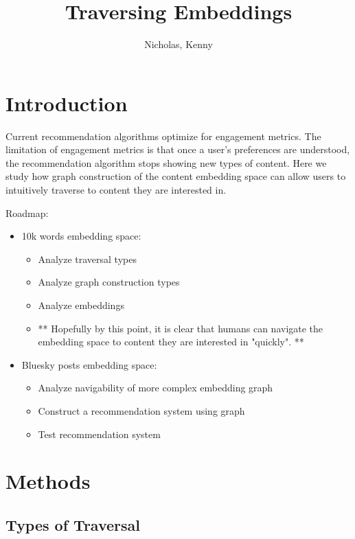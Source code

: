 \documentclass{article}
\title{Traversing Embeddings}
\author{Nicholas, Kenny}
\date{}
\begin{document}


\maketitle

\section{Introduction}

Current recommendation algorithms optimize for engagement metrics. The limitation of engagement metrics is that once a user's preferences are understood, the recommendation algorithm stops showing new types of content. Here we study how graph construction of the content embedding space can allow users to intuitively traverse to content they are interested in.

Roadmap:
\begin{itemize} 
    \item 10k words embedding space:
    \begin{itemize}
        \item Analyze traversal types
        \item Analyze graph construction types
        \item Analyze embeddings
        \item ** Hopefully by this point, it is clear that humans can navigate the embedding space to content they are interested in "quickly". **
    \end{itemize}
    \item Bluesky posts embedding space:
    \begin{itemize}
        \item Analyze navigability of more complex embedding graph
        \item Construct a recommendation system using graph
        \item Test recommendation system
    \end{itemize}
\end{itemize}

\section{Methods}

\subsection{Types of Traversal}
\end{document}
